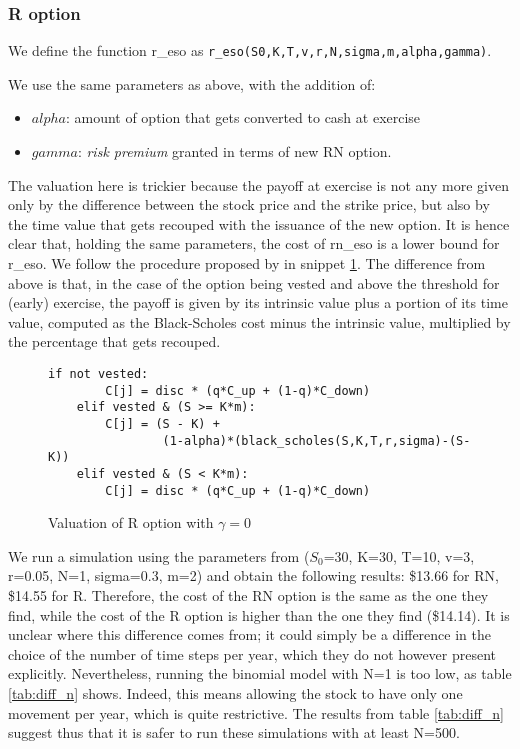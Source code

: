 \subsubsection{R option}
We define the function r\_eso as \verb|r_eso(S0,K,T,v,r,N,sigma,m,alpha,gamma)|.
    


We use the same parameters as above, with the addition of:
\begin{itemize}
    \item $alpha$: amount of option that gets converted to cash at exercise
    \item $gamma$: \textit{risk premium} granted in terms of new RN option. 
\end{itemize}

The valuation here is trickier because the payoff at exercise is not any more given only by the difference between the stock price and the strike price, but also by the time value that gets recouped with the issuance of the new option. It is hence clear that, holding the same parameters, the cost of rn\_eso is a lower bound for r\_eso. We follow the procedure proposed by \cite{huang2013dynamic} in snippet \ref*{fig:val_r_gamma0}. The difference from above is that, in the case of the option being vested and above the threshold for (early) exercise, the payoff is given by its intrinsic value plus a portion of its time value, computed as the Black-Scholes cost minus the intrinsic value, multiplied by the percentage that gets recouped. 

\begin{figure}[H]
    \begin{lstlisting}[breaklines, basicstyle=\ttfamily\small]
    if not vested:                
        C[j] = disc * (q*C_up + (1-q)*C_down)
    elif vested & (S >= K*m): 
        C[j] = (S - K) + 
                (1-alpha)*(black_scholes(S,K,T,r,sigma)-(S-K))
    elif vested & (S < K*m):
        C[j] = disc * (q*C_up + (1-q)*C_down)
    \end{lstlisting}
    \caption{Valuation of R option with $\gamma=0$}
    \label{fig:val_r_gamma0}
\end{figure}

 We run a simulation using the parameters from \cite{huang2013dynamic} ($S_0$=30, K=30, T=10, v=3, r=0.05, N=1, sigma=0.3, m=2) and obtain the following results: \$13.66 for RN, \$14.55 for R. Therefore, the cost of the RN option is the same as the one they find, while the cost of the R option is higher than the one they find (\$14.14). It is unclear where this difference comes from; it could simply be a difference in the choice of the number of time steps per year, which they do not however present explicitly. Nevertheless, running the binomial model with N=1 is too low, as table \ref*{tab:diff_n} shows. Indeed, this means allowing the stock to have only one movement per year, which is quite restrictive. The results from table \ref*{tab:diff_n} suggest thus that it is safer to run these simulations with at least N=500.

